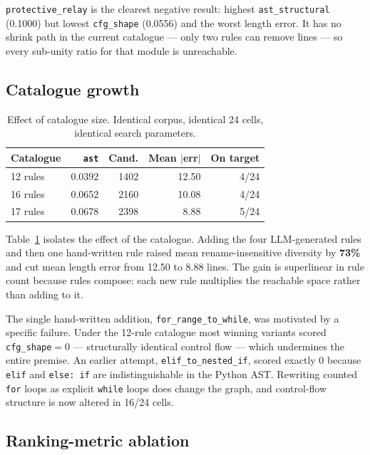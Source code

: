 \documentclass[10pt,twocolumn]{article}
\newcommand{\code}[1]{\texttt{\small #1}}
\begin{document}
\code{protective\_relay} is the clearest negative result: highest
\code{ast\_structural} (0.1000) but lowest \code{cfg\_shape} (0.0556) and the
worst length error. It has no shrink path in the current catalogue --- only two
rules can remove lines --- so every sub-unity ratio for that module is
unreachable.

\subsection{Catalogue growth}
\label{sec:catalogue}

\begin{table}[t]
\centering
\caption{Effect of catalogue size. Identical corpus, identical 24 cells,
identical search parameters.}
\label{tab:catalogue}
\small
\begin{tabular}{lrrrr}
\toprule
Catalogue & \code{ast} & Cand. & Mean $\lvert$err$\rvert$ & On target \\
\midrule
12 rules & 0.0392 & 1402 & 12.50 & 4/24 \\
16 rules & 0.0652 & 2160 & 10.08 & 4/24 \\
17 rules & 0.0678 & 2398 &  8.88 & 5/24 \\
\bottomrule
\end{tabular}
\end{table}

Table~\ref{tab:catalogue} isolates the effect of the catalogue. Adding the four
LLM-generated rules and then one hand-written rule raised mean
rename-insensitive diversity by \textbf{73\%} and cut mean length error from
12.50 to 8.88 lines. The gain is superlinear in rule count because rules compose:
each new rule multiplies the reachable space rather than adding to it.

The single hand-written addition, \code{for\_range\_to\_while}, was motivated by
a specific failure. Under the 12-rule catalogue most winning variants scored
\code{cfg\_shape}${}=0$ --- structurally identical control flow --- which
undermines the entire premise. An earlier attempt, \code{elif\_to\_nested\_if},
scored exactly $0$ because \code{elif} and \code{else: if} are indistinguishable
in the Python AST. Rewriting counted \code{for} loops as explicit \code{while}
loops does change the graph, and control-flow structure is now altered in 16/24
cells.

\subsection{Ranking-metric ablation}
\end{document}
